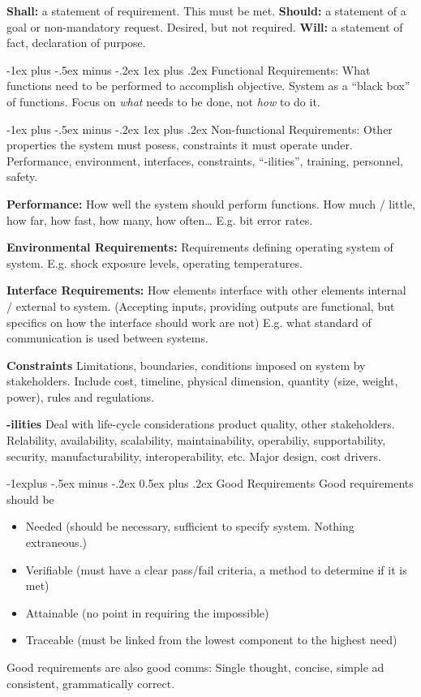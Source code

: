 \documentclass[letterpaper, 8pt]{extarticle}
\makeatletter
\renewcommand{\subsection}{\@startsection{subsection}{2}{0mm}%
                                {-1explus -.5ex minus -.2ex}%
                                {0.5ex plus .2ex}%
                                {\normalfont\tiny\bfseries}}
\renewcommand{\subsubsection}{\@startsection{subsubsection}{3}{0mm}%
                                {-1ex plus -.5ex minus -.2ex}%
                                {1ex plus .2ex}%
                                {\normalfont\tiny\itshape}}
\makeatother
\begin{document}
\begin{multicols*}{5}
\textbf{Shall:} a statement of requirement. This must be met.
\textbf{Should:} a statement of a goal or non-mandatory request. Desired, but not required.
\textbf{Will:} a statement of fact, declaration of purpose.

\subsubsection{Functional Requirements:}
What functions need to be performed to accomplish objective.
System as a ``black box'' of functions.
Focus on \textit{what} needs to be done, not \textit{how} to do it.

\subsubsection{Non-functional Requirements:}
Other properties the system must posess, constraints it must operate under.
Performance, environment, interfaces, constraints, ``-ilities'', training, personnel, safety.

\textbf{Performance:}
How well the system should perform functions.
How much / little, how far, how fast, how many, how often\dots
E.g. bit error rates.

\textbf{Environmental Requirements:}
Requirements defining operating system of system. E.g. shock exposure levels, operating temperatures.

\textbf{Interface Requirements:}
How elements interface with other elements internal / external to system.
(Accepting inputs, providing outputs are functional, but specifics on how the interface should work are not)
E.g. what standard of communication is used between systems.

\textbf{Constraints}
Limitations, boundaries, conditions imposed on system by stakeholders.
Include cost, timeline, physical dimension, quantity (size, weight, power), rules and regulations.

\textbf{-ilities}
Deal with life-cycle considerations product quality, other stakeholders.
Relability, availability, scalability, maintainability, operabiliy, supportability, security, manufacturability, interoperability, etc.
Major design, cost drivers.

\subsection{Good Requirements}
Good requirements should be
\begin{itemize}
    \item Needed (should be necessary, sufficient to specify system. Nothing extraneous.)
    \item Verifiable (must have a clear pass/fail criteria, a method to determine if it is met)
    \item Attainable (no point in requiring the impossible)
    \item Traceable (must be linked from the lowest component to the highest need)
\end{itemize}
Good requirements are also good comms:
Single thought, concise, simple ad consistent, grammatically correct.


\end{multicols*}
\end{document}

